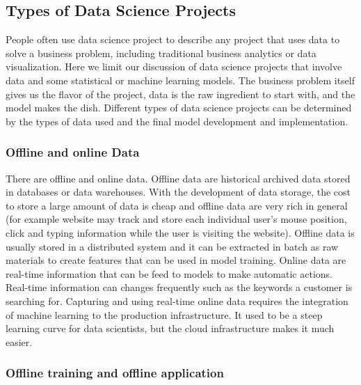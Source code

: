 \documentclass[12pt,]{krantz}
\theoremstyle{definition}
\theoremstyle{definition}
\theoremstyle{definition}
\theoremstyle{remark}
\begin{document}
\subsection{Types of Data Science
Projects}\label{types-of-data-science-projects}

People often use data science project to describe any project that uses
data to solve a business problem, including traditional business
analytics or data visualization. Here we limit our discussion of data
science projects that involve data and some statistical or machine
learning models. The business problem itself gives us the flavor of the
project, data is the raw ingredient to start with, and the model makes
the dish. Different types of data science projects can be determined by
the types of data used and the final model development and
implementation.

\subsubsection{Offline and online Data}\label{offline-and-online-data}

There are offline and online data. Offline data are historical archived
data stored in databases or data warehouses. With the development of
data storage, the cost to store a large amount of data is cheap and
offline data are very rich in general (for example website may track and
store each individual user's mouse position, click and typing
information while the user is visiting the website). Offline data is
usually stored in a distributed system and it can be extracted in batch
as raw materials to create features that can be used in model training.
Online data are real-time information that can be feed to models to make
automatic actions. Real-time information can changes frequently such as
the keywords a customer is searching for. Capturing and using real-time
online data requires the integration of machine learning to the
production infrastructure. It used to be a steep learning curve for data
scientists, but the cloud infrastructure makes it much easier.

\subsubsection{Offline training and offline
application}\label{offline-training-and-offline-application}
\end{document}
